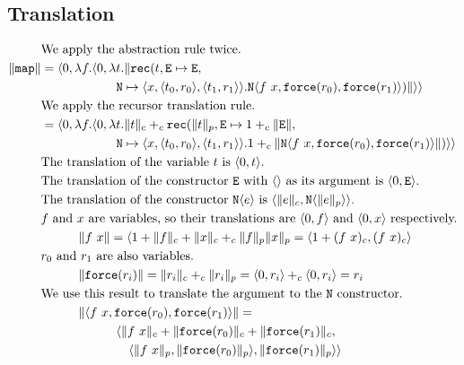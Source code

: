 \subsection{Translation}
%
\begin{align*}
  &\text{We apply the abstraction rule twice.} \\
  \|\T{map}\| &= \LP 0,\lambda f.\LP 0,\lambda t.\|\T{rec}(t, \T{E} \mapsto \T{E},\\
              &\quadsix\T{N} \mapsto \LP x,\LP t_0,r_0\RP,\LP t_1,r_1\RP\RP.\T{N}\LP f\ x,\T{force}(r_0),\T{force}(r_1)\RP)\|\RP\RP \\
              &\text{We apply the recursor translation rule.} \\
              &= \LP 0,\lambda f.\LP 0,\lambda t.\|t\|_c +_c \T{rec}(\|t\|_p, \T{E} \mapsto 1 +_c \|\T{E}\|,\\
              &\quadsix \T{N} \mapsto \LP x,\LP t_0,r_0\RP,\LP t_1,r_1\RP\RP.1 +_c \|\T{N}\LP f\ x,\T{force}(r_0),\T{force}(r_1)\RP\|)\RP\RP \\
              &\text{The translation of the variable $t$ is $\LP 0,t\RP$.} \\
              &\text{The translation of the constructor \T{E} with $\LP\RP$ as its argument is $\LP 0,\T{E}\RP$.} \\
              &\text{The translation of the constructor \T{N}$\LP e\RP$ is $\LP \|e\|_c,\T{N}\LP\|e\|_p\RP\RP$.} \\
              &\text{$f$ and $x$ are variables, so their translations are $\LP 0,f\RP$ and $\LP 0,x\RP$ respectively.}\\
              &\quadthree \|f\ x\| = \LP 1 + \|f\|_c + \|x\|_c +_c \|f\|_p\|x\|_p = \LP 1 + (f\ x)_c,(f\ x)_c\RP \\
              &\text{$r_0$ and $r_1$ are also variables.} \\
              &\quadthree \|\T{force}(r_i)\| = \|r_i\|_c +_c \|r_i\|_p = \LP 0,r_i\RP +_c \LP 0,r_i\RP = r_i \\
              &\text{We use this result to translate the argument to the \T{N} constructor.} \\
              &\quadthree \|\LP f\ x,\T{force}(r_0),\T{force}(r_1)\RP\| = \\
              &\quadsix \LP \|f\ x\|_c + \|\T{force}(r_0)\|_c + \|\T{force}(r_1)\|_c, \\
              &\quadseven \LP \|f\ x\|_p,\|\T{force}(r_0)\|_p\RP,\|\T{force}(r_1)\|_p\RP\RP \\

\end{align*}

